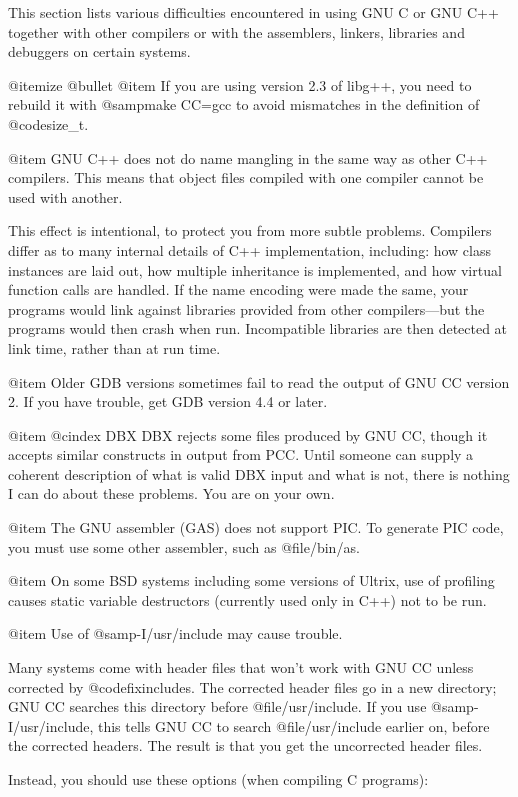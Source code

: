 This section lists various difficulties encountered in using GNU C or
GNU C++ together with other compilers or with the assemblers, linkers,
libraries and debuggers on certain systems.

@itemize @bullet
@item
If you are using version 2.3 of libg++, you need to rebuild it with
@samp{make CC=gcc} to avoid mismatches in the definition of
@code{size_t}.

@item
GNU C++ does not do name mangling in the same way as other C++
compilers.  This means that object files compiled with one compiler
cannot be used with another.

This effect is intentional, to protect you from more subtle problems.
Compilers differ as to many internal details of C++ implementation,
including: how class instances are laid out, how multiple inheritance is
implemented, and how virtual function calls are handled.  If the name
encoding were made the same, your programs would link against libraries
provided from other compilers---but the programs would then crash when
run.  Incompatible libraries are then detected at link time, rather than
at run time.

@item
Older GDB versions sometimes fail to read the output of GNU CC version
2.  If you have trouble, get GDB version 4.4 or later.

@item
@cindex DBX
DBX rejects some files produced by GNU CC, though it accepts similar
constructs in output from PCC.  Until someone can supply a coherent
description of what is valid DBX input and what is not, there is
nothing I can do about these problems.  You are on your own.

@item
The GNU assembler (GAS) does not support PIC.  To generate PIC code, you
must use some other assembler, such as @file{/bin/as}.

@item
On some BSD systems including some versions of Ultrix, use of profiling
causes static variable destructors (currently used only in C++) not to
be run.

@item
Use of @samp{-I/usr/include} may cause trouble.

Many systems come with header files that won't work with GNU CC unless
corrected by @code{fixincludes}.  The corrected header files go in a new
directory; GNU CC searches this directory before @file{/usr/include}.
If you use @samp{-I/usr/include}, this tells GNU CC to search
@file{/usr/include} earlier on, before the corrected headers.  The
result is that you get the uncorrected header files.

Instead, you should use these options (when compiling C programs):

